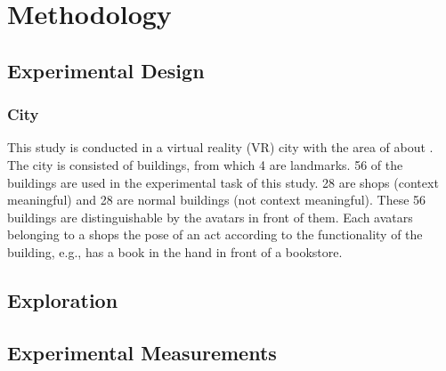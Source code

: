 \chapter{Methodology}

\section{Experimental Design}

\subsection{City}
This study is conducted in a virtual reality (VR) city with the area of about . The city is consisted of  buildings, from which 4 are landmarks. 56 of the buildings are used in the experimental task of this study. 28 are shops {\selectfont(context meaningful)} and 28 are normal buildings {\selectfont(not context meaningful)}. These 56 buildings are distinguishable by the avatars \todo{[or agents?]} in front of them. Each avatars belonging to a shops the pose of an act according to the functionality of the building, e.g., has a book in the hand in front of a bookstore. 





\section{Exploration}

\section{Experimental Measurements}

